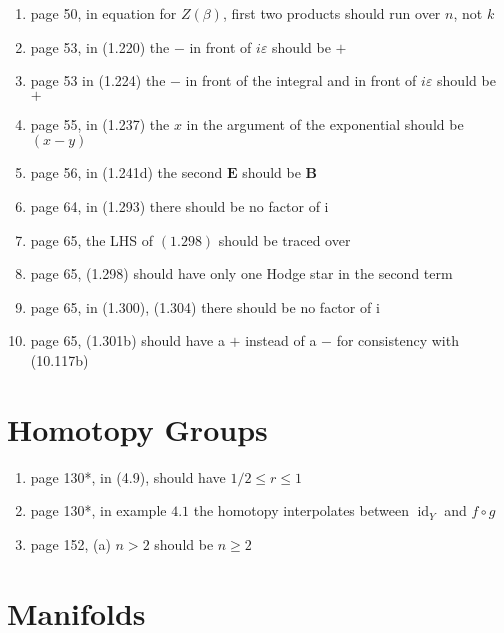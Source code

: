 \documentclass{article}
\newcommand\Dag{\textsuperscript{\dagger}}
\begin{document}
\begin{enumerate}
\item page 50, in equation for $Z(\beta)$, first two products should run over $n$, not $k$

\item page 53, in (1.220) the $-$ in front of $i \varepsilon$ should be $+$

\item page 53 in (1.224) the $-$ in front of the integral and in front of $i \varepsilon$ should be $+$

\item page 55, in (1.237) the $x$ in the argument of the exponential should be $(x-y)$

\item page 56, in (1.241d) the second $\mathbf{E}$ should be $\mathbf{B}$

\item page 64, in (1.293) there should be no factor of i

\item page 65, the LHS of $(1.298)$ should be traced over

\item page 65, (1.298) should have only one Hodge star in the second term

\item page 65, in (1.300), (1.304) there should be no factor of $\mathrm{i}$

\item page 65, (1.301b) should have a $+$ instead of a $-$ for consistency with (10.117b)

\end{enumerate}

\section*{Homotopy Groups}

\begin{enumerate}
\item page 130*, in (4.9), should have $1 / 2 \leq r \leq 1$
\item page 130*, in example $4.1$ the homotopy interpolates between $\operatorname{id}_{Y}$ and $f \circ g$
\item page 152\Dag, (a) $n > 2$ should be $n \geq 2$
\end{enumerate}

\section*{Manifolds}
\end{document}
